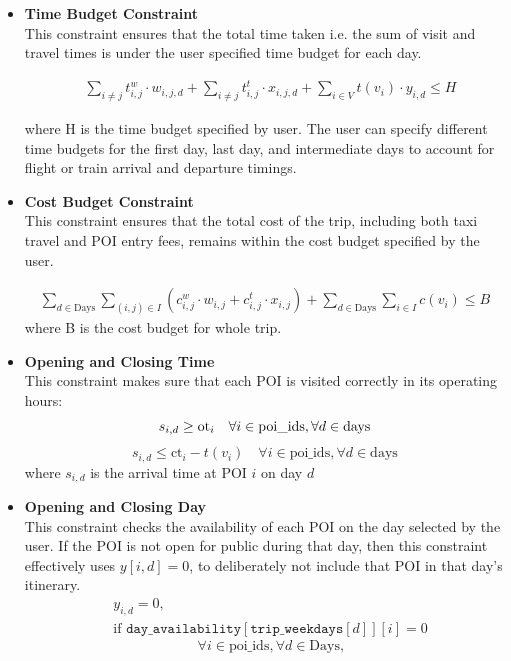 \begin{itemize}

\item \textbf{Time Budget Constraint}\\
This constraint ensures that the total time taken i.e. the sum of visit and travel times is under the user specified time budget for each day.

\begin{align}
\label{mul_day_9}
    & \sum_{i \ne j} t^{w}_{i,j} \cdot w_{i,j,d}
    + \sum_{i \ne j} t^{t}_{i,j} \cdot x_{i,j,d}
    + \sum_{i \in V} t(v_i) \cdot y_{i,d} \leq H
\end{align}

where H is the time budget specified by user. The user can specify different time budgets for the first day, last day, and intermediate days to account for flight or train arrival and departure timings.
\\[1ex]
\item \textbf{Cost Budget Constraint} \\
 This constraint ensures that the total cost of the trip, including both taxi travel and POI entry fees, remains within the cost budget specified by the user.

\begin{align}
\label{mul_day_25}
\sum_{d \in \text{Days}} \sum_{(i,j) \in I} \left(c^{w}_{i,j} \cdot w_{i,j} + c^{t}_{i,j} \cdot x_{i,j} \right) + \sum_{d \in \text{Days}} \sum_{i \in I} c(v_i) \leq B 
\end{align}
where B is the cost budget for whole trip.
\\[1ex]
\item \textbf{Opening and Closing Time}\\
    This constraint makes sure that each POI is visited correctly in its operating hours:
    \begin{equation}
    \label{mul_day_29}
    s_{i,d} \geq \text{ot}_i \quad \forall i \in \text{{poi\_ids}}, \forall d \in \text{days} \\
    \end{equation}
    \begin{equation}
    \label{mul_day_30}
        s_{i,d} \leq \text{ct}_i - t(v_i) \quad \forall i \in \text{{poi\_ids}}, \forall d \in \text{days}
    \end{equation}
    \noindent
    where \( s_{i,d} \) is the arrival time at POI \( i \) on day \( d \)
\\[1ex]
\item \textbf{Opening and Closing Day}\\
    This constraint checks the availability of each POI on the day selected by the user. If the POI is not open for public during that day, then this constraint effectively uses $y[i, d] = 0$, to deliberately not include that POI in that day's itinerary.
    \begin{align}
\label{mul_day_31}
& y_{i,d} = 0, \\
&\text{if } \texttt{day\_availability}[\texttt{trip\_weekdays}[d]][i] = 0 \nonumber
\end{align}
    \[\quad \forall i \in \text{{poi\_ids}}, \forall d \in \text{Days},\]
  

\end{itemize}
